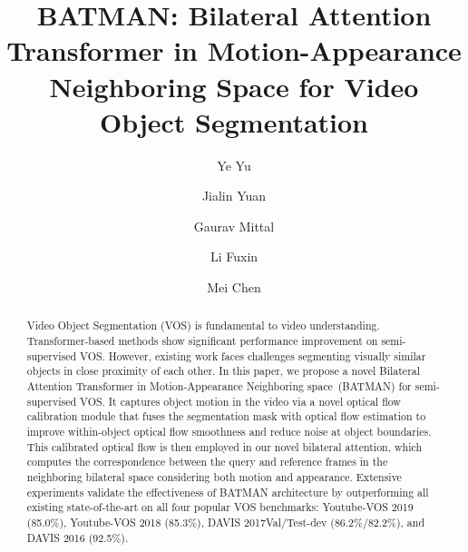 \documentclass[runningheads]{llncs}
\begin{document}
\pagestyle{headings}
\mainmatter
\def\ECCVSubNumber{5512}  


\newcommand{\shortname}{BATMAN}
\newcommand{\fullname}{Bilateral Attention Transformer in Motion-Appearance Neighboring space}


\title{\shortname: Bilateral Attention Transformer in Motion-Appearance Neighboring Space for Video Object Segmentation} 

\begin{comment}
\titlerunning{ECCV-22 submission ID \ECCVSubNumber} 
\authorrunning{ECCV-22 submission ID \ECCVSubNumber} 
\author{Anonymous ECCV submission}
\institute{Paper ID \ECCVSubNumber}
\end{comment}


\author{Ye Yu \and
Jialin Yuan \and
Gaurav Mittal \and
Li Fuxin \and
Mei Chen
}

\maketitle

\begin{abstract}
Video Object Segmentation (VOS) is fundamental to video understanding.
Transformer-based methods show significant performance improvement on semi-supervised VOS.
However, existing work faces challenges segmenting visually similar objects in close proximity of each other.
In this paper, we propose a novel {\fullname}~(\shortname) for semi-supervised VOS. 
It captures object motion in the video via a novel optical flow calibration module that fuses the segmentation mask with optical flow estimation to improve within-object optical flow smoothness and reduce noise at object boundaries. This calibrated optical flow is then employed in our novel bilateral attention, which computes the correspondence between the query and reference frames in the neighboring bilateral space considering both motion and appearance. Extensive experiments validate the effectiveness of {\shortname} architecture by outperforming all existing state-of-the-art on all four popular VOS benchmarks: Youtube-VOS 2019 (85.0\%),  Youtube-VOS  2018 (85.3\%),  DAVIS  2017Val/Test-dev (86.2\%/82.2\%), and DAVIS 2016 (92.5\%).


\end{abstract}
\end{document}
